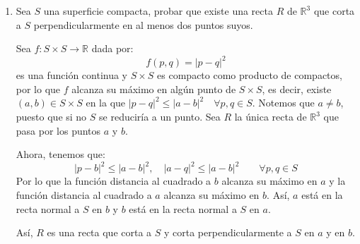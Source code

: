 \begin{ejercicio}
\begin{enumerate}
            Sea:
            \begin{equation*}
                A = \{|p-a|:p\in S\}\subset \mathbb{R}
            \end{equation*}
            Notemos que $A$ está acotado inferiormente por $0$, por lo que $\exists r = \inf\limits_{p\in S}|p-a|$, de donde tendremos que existe $\{p_n\}\subset S$ tal que $\{|p_n-a|\}\to r$, por lo que $\{|p_n-a|\}$ es una sucesión acotada:
            \begin{equation*}
                \exists C\in \mathbb{R}~:~|p_n-a| \leq C\quad \forall n\in \mathbb{N}
            \end{equation*}
            Así, tenemos que $\{p_n\}\subset B(a,C)$, por lo que existe una parcial $\{p_{\sigma(n)}\}$ convergente, a cierto punto $p$, que debe estar en $S$ por ser $S$ una superficie cerrada. Así:
            \begin{equation*}
                r = \lim_{n\to\infty}|p_n-a| = \lim_{n\to\infty}|p_{\sigma(n)}-a| = \left|\lim_{n\to\infty}p_{\sigma(n)} -a\right| = |p-a|
            \end{equation*}
        \item Sea $S$ una superficie compacta, probar que existe una recta $R$ de $\mathbb{R}^3$ que corta a $S$ perpendicularmente en al menos dos puntos suyos.

            Sea $f:S\times S\to \mathbb{R}$ dada por:
            \begin{equation*}
                f(p,q) = |p-q|^2
            \end{equation*}
            es una función continua y $S\times S$ es compacto como producto de compactos, por lo que $f$ alcanza su máximo en algún punto de $S\times S$, es decir, existe $(a,b)\in S\times S$ en la que $|p-q|^2 \leq |a-b|^2\quad \forall p,q\in S$. Notemos que $a\neq b$, puesto que si no $S$ se reduciría a un punto. Sea $R$ la única recta de $\mathbb{R}^3$ que pasa por los puntos $a$ y $b$. 

            Ahora, tenemos que:
            \begin{equation*}
                |p-b|^2 \leq |a-b|^2,\quad |a-q|^2 \leq |a-b|^2 \qquad \forall p,q\in S
            \end{equation*}
            Por lo que la función distancia al cuadrado a $b$ alcanza su máximo en $a$ y la función distancia al cuadrado a $a$ alcanza su máximo en $b$. Así, $a$ está en la recta normal a $S$ en $b$ y $b$ está en la recta normal a $S$ en $a$.

            Así, $R$ es una recta que corta a $S$ y corta perpendicularmente a $S$ en $a$ y en $b$.
    \end{enumerate}
\end{ejercicio}
